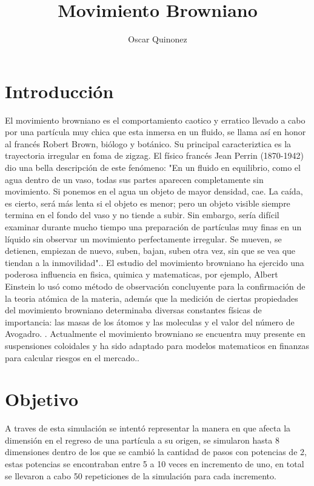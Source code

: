 \documentclass{article}
\title { Movimiento Browniano}
\author{Oscar Quinonez}
\begin{document}
\maketitle

\section{Introducci\'on}\label{intro}

El movimiento browniano es el comportamiento caotico y erratico  llevado a cabo por una part\'icula muy chica que esta inmersa en un fluido, se llama as\'i en honor al franc\'es Robert Brown, bi\'ologo y bot\'anico. Su principal caracteriztica es la trayectoria irregular en foma de zigzag. El f\'isico franc\'es Jean Perrin (1870-1942) dio una bella descripci\'on de este fen\'omeno: "En un fluido en equilibrio, como el agua dentro de un vaso, todas sus partes aparecen completamente sin movimiento. Si ponemos en el agua un objeto de mayor densidad, cae. La ca\'ida, es cierto, ser\'a m\'as lenta si el objeto es menor; pero un objeto visible siempre termina en el fondo del vaso y no tiende a subir. Sin embargo, ser\'ia dif\'icil examinar durante mucho tiempo una preparaci\'on de part\'iculas muy finas en un l\'iquido sin observar un movimiento perfectamente irregular. Se mueven, se detienen, empiezan de nuevo, suben, bajan, suben otra vez, sin que se vea que tiendan a la inmovilidad".\cite{baz}.
El estudio del movimiento browniano ha ejercido una poderosa influencia en fisica, quimica y matematicas, por ejemplo, Albert Einstein lo us\'o como m\'etodo de observaci\'on concluyente para la confirmaci\'on de la teoria at\'omica de la materia, adem\'as que la medici\'on de ciertas propiedades del movimiento browniano determinaba diversas constantes f\'isicas de importancia: las masas de los \'atomos y las moleculas y el valor del n\'umero de Avogadro. \citet{mov}.
Actualmente el movimiento browniano se encuentra muy presente en suspensiones coloidales y ha sido adaptado para modelos matematicos en finanzas para calcular riesgos en el mercado.\citep{dat}.
 
\section{Objetivo}\label{met}

A traves de esta simulaci\'on se intent\'o representar la manera en que afecta la dimensi\'on en el regreso de una part\'icula a su origen, se simularon hasta 8 dimensiones dentro de los que se cambi\'o la cantidad de pasos con potencias de 2, estas potencias se encontraban entre 5 a 10 veces en incremento de uno, en total se llevaron a cabo 50 repeticiones de la simulaci\'on para cada incremento.
\end{document}
